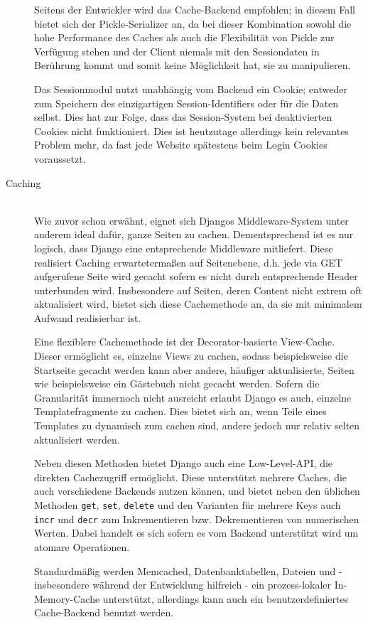 \begin{description}
Seitens der Entwickler wird das Cache-Backend empfohlen; in diesem Fall bietet sich der
Pickle-Serializer an, da bei dieser Kombination sowohl die hohe Performance des Caches als auch die
Flexibilität von Pickle zur Verfügung stehen und der Client niemals mit den Sessiondaten in
Berührung kommt und somit keine Möglichkeit hat, sie zu manipulieren.

Das Sessionmodul nutzt unabhängig vom Backend ein Cookie; entweder zum Speichern des einzigartigen
Session-Identifiers oder für die Daten selbst. Dies hat zur Folge, dass das Session-System bei
deaktivierten Cookies nicht funktioniert. Dies ist heutzutage allerdings kein relevantes Problem
mehr, da fast jede Website spätestens beim Login Cookies voraussetzt.


\item[Caching] \hfill \\
Wie zuvor schon erwähnt, eignet sich Djangos Middleware-System unter anderem ideal dafür, ganze
Seiten zu cachen. Dementsprechend ist es nur logisch, dass Django eine entsprechende Middleware
mitliefert.  Diese realisiert Caching erwartetermaßen auf Seitenebene, d.h. jede via GET aufgerufene
Seite wird gecacht sofern es nicht durch entsprechende Header unterbunden wird. Insbesondere auf
Seiten, deren Content nicht extrem oft aktualisiert wird, bietet sich diese Cachemethode an, da sie
mit minimalem Aufwand realisierbar ist.

Eine flexiblere Cachemethode ist der Decorator-basierte View-Cache. Dieser ermöglicht es, einzelne
Views zu cachen, sodass beispielsweise die Startseite gecacht werden kann aber andere, häufiger
aktualisierte, Seiten wie beispielsweise ein Gästebuch nicht gecacht werden. Sofern die Granularität
immernoch nicht ausreicht erlaubt Django es auch, einzelne Templatefragmente zu cachen. Dies bietet
sich an, wenn Teile eines Templates zu dynamisch zum cachen sind, andere jedoch nur relativ selten
aktualisiert werden.

Neben diesen Methoden bietet Django auch eine Low-Level-API, die direkten Cachezugriff ermöglicht.
Diese unterstützt mehrere Caches, die auch verschiedene Backends nutzen können, und bietet neben den
üblichen Methoden \lstinline{get}, \lstinline{set}, \lstinline{delete} und den Varianten für mehrere
Keys auch \lstinline{incr} und \lstinline{decr} zum Inkrementieren bzw. Dekrementieren von
numerischen Werten. Dabei handelt es sich sofern es vom Backend unterstützt wird um atomare
Operationen.

Standardmäßig werden Memcached, Datenbanktabellen, Dateien und - insbesondere während der
Entwicklung hilfreich - ein prozess-lokaler In-Memory-Cache unterstützt, allerdings kann auch ein
benutzerdefiniertes Cache-Backend benutzt werden.



\end{description}

